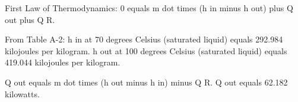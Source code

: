 First Law of Thermodynamics:  
0 equals m dot times (h in minus h out) plus Q out plus Q R.  

From Table A-2:  
h in at 70 degrees Celsius (saturated liquid) equals 292.984 kilojoules per kilogram.  
h out at 100 degrees Celsius (saturated liquid) equals 419.044 kilojoules per kilogram.  

Q out equals m dot times (h out minus h in) minus Q R.  
Q out equals 62.182 kilowatts.
